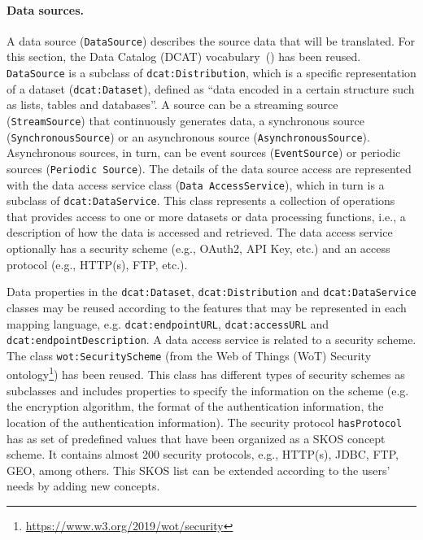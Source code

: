 \noindent\paragraph{\textbf{Data sources.}} A data source (\texttt{DataSource}) describes the source data that will be translated. For this section, the Data Catalog (DCAT) vocabulary~(\cite{albertoni2020dcat2}) has been reused. \texttt{DataSource} is a subclass of \texttt{dcat:Distribution}, which is a specific representation of a dataset (\texttt{dcat:Dataset}), defined as ``data encoded in a certain structure such as lists, tables and databases''. A source can be a streaming source (\texttt{StreamSource}) that continuously generates data, a synchronous source (\texttt{SynchronousSource}) or an asynchronous source (\texttt{AsynchronousSource}). Asynchronous sources, in turn, can be event sources (\texttt{EventSource}) or periodic sources (\texttt{Periodic Source}). The details of the data source access are represented with the data access service class (\texttt{Data AccessService}), which in turn is a subclass of \texttt{dcat:DataService}. This class represents a collection of operations that provides access to one or more datasets or data processing functions, i.e., a description of how the data is accessed and retrieved. The data access service optionally has a security scheme (e.g., OAuth2, API Key, etc.) and an access protocol (e.g., HTTP(s), FTP, etc.).

Data properties in the \texttt{dcat:Dataset}, \texttt{dcat:Distribution} and \texttt{dcat:DataService} classes may be reused according to the features that may be represented in each mapping language, e.g. \texttt{dcat:endpointURL},  \texttt{dcat:accessURL} and \texttt{dcat:endpointDescrip\-tion}. A data access service is related to a security scheme. The class \texttt{wot:Securi\-tyScheme} (from the Web of Things (WoT) Security ontology\footnote{\label{foot:wotsec}\url{https://www.w3.org/2019/wot/security}}) has been reused. This class has different types of security schemes as subclasses and includes properties to specify the information on the scheme (e.g. the encryption algorithm, the format of the authentication information, the location of the authentication information). The security protocol \texttt{hasProtocol} has as set of predefined values that have been organized as a SKOS concept scheme. It contains almost 200 security protocols, e.g., HTTP(s), JDBC, FTP, GEO, among others. This SKOS list can be extended according to the users' needs by adding new concepts. 

